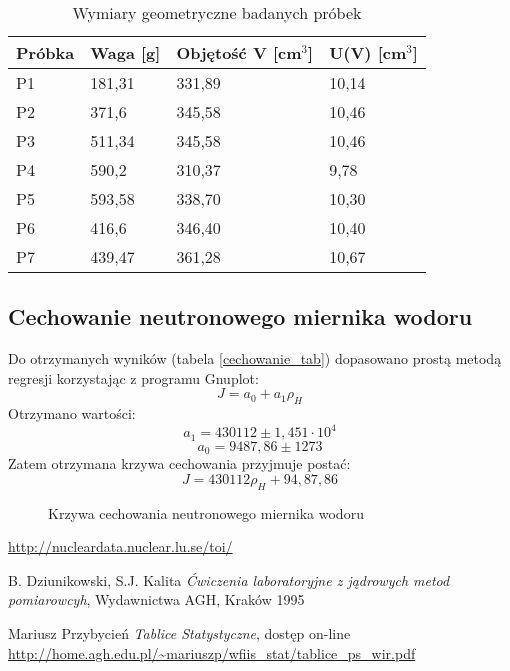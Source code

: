 \documentclass{article}
\begin{document}
\begin{table}[h!]
\centering
\label{wynikiP}
\caption{Wymiary geometryczne badanych próbek}
\begin{tabular}{|C{2cm}|C{2cm}|C{2cm}|C{2cm}|}\hline
	Próbka & Waga [g] & Objętość V [cm$^3$] & U(V) [cm$^3$] \\ \hline
		P1	&	181,31	&	331,89	&	10,14 \\ \hline
		P2	&	371,6	&	345,58	&	10,46  \\ \hline
		P3	&	511,34	&	345,58	&	10,46 \\ \hline
		P4	&	590,2	&	310,37	&	9,78 \\ \hline
		P5	&	593,58	&	338,70	&	10,30 \\ \hline
		P6	&	416,6	&	346,40	&	10,40 \\ \hline
		P7	&	439,47	&	361,28	&	10,67 \\ \hline

\end{tabular}

\end{table}
\newpage
\subsection{Cechowanie neutronowego miernika wodoru}
Do otrzymanych wyników (tabela \ref{cechowanie_tab}) dopasowano prostą metodą regresji korzystając z programu Gnuplot:
\begin{equation}
	J = a_0 + a_1\rho_H
\end{equation}
 Otrzymano wartości:
 \begin{equation*}
 	a_1 = 430112 \pm 1,451\cdot 10^4
 \end{equation*}
 \begin{equation*}
 	a_0 = 9487,86 \pm 1273
 \end{equation*}
Zatem otrzymana krzywa cechowania przyjmuje postać:
\begin{equation*}
	J = 430112\rho_H + 94,87,86
\end{equation*}



\begin{figure}[h!]
	\fontsize{6}{8}\selectfont %
	\centering
	\resizebox{1.0\textwidth}{!}{}	
	\caption{Krzywa cechowania neutronowego miernika wodoru}
	\label{krzywa}
\end{figure}


\newpage
\begin{thebibliography}{9}
	
	
	\url{http://nucleardata.nuclear.lu.se/toi/}

	
	B. Dziunikowski, S.J. Kalita
	\emph{Ćwiczenia laboratoryjne z jądrowych metod pomiarowcyh}, Wydawnictwa AGH, Kraków 1995
	
	Mariusz Przybycień \emph{Tablice Statystyczne}, dostęp on-line\\
	\url{http://home.agh.edu.pl/~mariuszp/wfiis_stat/tablice_ps_wir.pdf}
\end{thebibliography}
\vspace{2cm}
\end{document}
